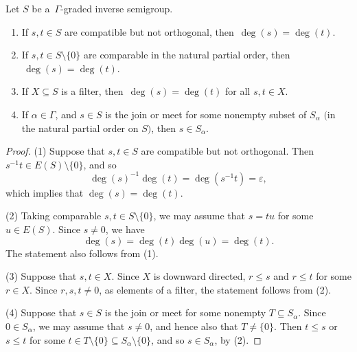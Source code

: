 \documentclass[10pt,a4paper]{amsart}
\begin{document}
\begin{lemma} \label{filter-lemma}
Let $S$ be a $\, \Gamma$-graded inverse semigroup.
\begin{enumerate}[\upshape(1)]
\item If $s,t \in S$ are compatible but not orthogonal, then $\, \deg(s)=\deg(t)$.

\smallskip 

\item If $s,t \in S \setminus \{0\}$ are comparable in the natural partial order, then $\, \deg(s)=\deg(t)$.

\smallskip 

\item If $X \subseteq S$ is a filter, then $\, \deg(s)=\deg(t)$ for all $s, t\in X$.

\smallskip

\item If $\alpha \in \Gamma$, and $s \in S$ is the join or meet for some nonempty subset of $S_{\alpha}$ $($in the natural partial order on $S$$)$, then $s \in S_{\alpha}$. 
\end{enumerate}
\end{lemma}

\begin{proof}
(1) Suppose that $s,t \in S$ are compatible but not orthogonal. Then $s^{-1}t \in E(S) \setminus \{0\}$, and so 
\[\deg(s)^{-1}\deg(t) = \deg(s^{-1}t) = \varepsilon,\]
which implies that $\deg(s)=\deg(t)$.

\smallskip

(2) Taking comparable $s,t \in S \setminus \{0\}$, we may assume that $s=tu$ for some $u \in E(S)$. Since $s \neq 0$, we have
\[\deg(s) = \deg(t)\deg(u) = \deg(t).\]
The statement also follows from (1).

\smallskip

(3) Suppose that $s, t\in X$. Since $X$ is downward directed, $r \leq s$ and $r \leq t$ for some $r \in X$. Since $r,s,t \neq 0$, as elements of a filter, the statement follows from (2).

\smallskip

(4) Suppose that $s \in S$ is the join or meet for some nonempty $T \subseteq S_{\alpha}$. Since $0 \in S_{\alpha}$, we may assume that $s \neq 0$, and hence also that $T \neq \{0\}$. Then $t \leq s$ or $s \leq t$ for some $t \in T\setminus \{0\} \subseteq S_{\alpha} \setminus \{0\}$, and so $s \in S_{\alpha}$, by (2).
\end{proof}
\end{document}
